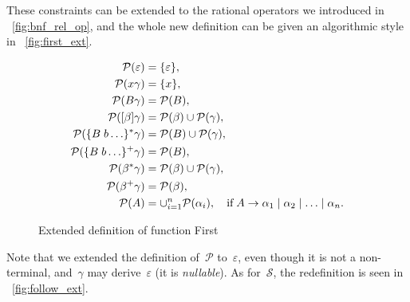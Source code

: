 These constraints can be extended to the rational operators we
introduced in \fig~\vref{fig:bnf_rel_op}, and the whole new definition
can be given an algorithmic style in \fig~\vref{fig:first_ext}.
\begin{figure}[!t]
\centering
\begin{framed}
\begin{align*}
\mathcal{P}(\varepsilon) &= \{\varepsilon\},\\
\mathcal{P}(x \gamma) &= \{x\},\\
\mathcal{P}(B \gamma) &= \mathcal{P}(B),\\
\mathcal{P}([\beta] \gamma) &= \mathcal{P}(\beta) \cup \mathcal{P}(\gamma),\\
\mathcal{P}(\{B \; b \ldots\}^* \gamma) &= \mathcal{P}(B) \cup \mathcal{P}(\gamma),\\
\mathcal{P}(\{B \; b \ldots\}^+ \gamma) &= \mathcal{P}(B),\\
\mathcal{P}(\beta^*\gamma) &= \mathcal{P}(\beta) \cup \mathcal{P}(\gamma),\\
\mathcal{P}(\beta^+\gamma) &= \mathcal{P}(\beta),\\
\mathcal{P}(A) &= \cup_{i=1}^{n}\mathcal{P}(\alpha_i), \quad \text{if} \; A
\rightarrow \alpha_1 \mid \alpha_2 \mid \ldots \mid \alpha_n.
\end{align*}
\end{framed}
\caption{Extended definition of function First\label{fig:first_ext}}
\end{figure}
Note that we extended the definition of~\(\mathcal{P}\)
to~\(\varepsilon\), even though it is not a non\hyp{}terminal,
and~\(\gamma\) may derive~\(\varepsilon\) (it is \emph{nullable}). As
for~\(\mathcal{S}\), the redefinition is seen in
\fig~\vref{fig:follow_ext}.

